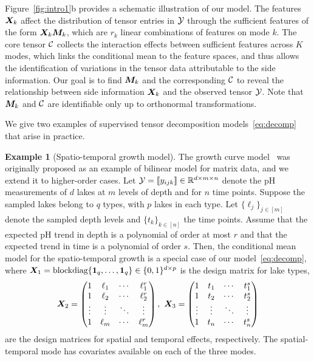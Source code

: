 \documentclass{article}
\theoremstyle{definition}
\theoremstyle{definition}
\newtheorem{example}{Example}
\begin{document}
Figure~\ref{fig:intro1}b provides a schematic illustration of our model. The features $\bm X_k$ affect the distribution of tensor entries in $\mathcal{Y}$ through the sufficient features of the form $\bm X_k\bm M_k$, which are $r_k$ linear combinations of features on mode $k$. The core tensor $\mathcal{C}$ collects the interaction effects between sufficient features across $K$ modes, which links the conditional mean to the feature spaces, and thus allows the identification of variations in the tensor data attributable to the side information. Our goal is to find $\bm M_k$ and the corresponding $\mathcal{C}$ to reveal the relationship between side information $\bm X_k$ and the observed tensor $\mathcal{Y}$. Note that $\bm M_k$ and $\mathcal{C}$ are identifiable only up to orthonormal transformations.  

We give two examples of supervised tensor decomposition models~\eqref{eq:decomp} that arise in practice.
\begin{example}[Spatio-temporal growth model]
The growth curve model~\citep{srivastava2008models} was originally proposed as an example of bilinear model for matrix data, and we extend it to higher-order cases. Let $\mathcal{Y}=\llbracket y_{ijk} \rrbracket\in\mathbb{R}^{d \times m\times n}$ denote the pH measurements of $d$ lakes at $m$ levels of depth and for $n$ time points. Suppose the sampled lakes belong to $q$ types, with $p$ lakes in each type. Let $\{\ell_j\}_{j\in[m]}$ denote the sampled depth levels and $\{t_k\}_{k\in[n]}$ the time points. Assume that the expected pH trend in depth is a polynomial of order at most $r$ and that the expected trend in time is a polynomial of order $s$. Then, the conditional mean model for the spatio-temporal growth is a special case of our model~\eqref{eq:decomp}, where $\bm X_1=\text{blockdiag}\{\mathbf{1}_q,\ldots,\mathbf{1}_q\}\in \{0,1\}^{d\times p}$ is the design matrix for lake types, 
\[
\bm X_2=
\begin{pmatrix}
1 & \ell_1&\cdots &\ell^{r}_1\\
1 & \ell_2&\cdots &\ell^{r}_2\\
\vdots &\vdots&\ddots&\vdots\\
1&\ell_{m}&\cdots&\ell^{r}_{m}
\end{pmatrix},\
\bm X_3=
\begin{pmatrix}
1 & t_1&\cdots &t^{s}_1\\
1 & t_2&\cdots &t^{s}_2\\
\vdots &\vdots&\ddots&\vdots\\
1&t_{n}&\cdots&t^{s}_{n}
\end{pmatrix}
\]
are the design matrices for spatial and temporal effects, respectively. The spatial-temporal mode has covariates available on each of the three modes. 

\end{example}
\end{document}
